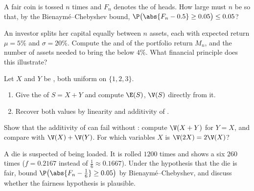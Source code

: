 \begin{exercise}[$\star$]\label{exo:g12:sums:3}
A fair coin is tossed $n$ times and $F_n$ denotes the  of heads.
How large must $n$ be so that, by the Bienaymé--Chebyshev bound,
$\P\bigl(\abs{F_n - 0.5} \geq 0.05\bigr) \leq 0.05$?
\end{exercise}

\begin{exercise}[$\star\star$]\label{exo:g12:sums:4}
An investor splits her capital equally between $n$  assets,
each with expected return $\mu = 5\%$ and 
$\sigma = 20\%$. Compute the  and  of the
portfolio return $M_n$, and the number of assets needed to bring the
 below $4\%$. What financial principle does this
illustrate?
\end{exercise}

\begin{exercise}[$\star\star$]\label{exo:g12:sums:5}
Let $X$ and $Y$ be , both uniform on $\{1, 2, 3\}$.
\begin{enumerate}
  \item Give the  of $S = X + Y$ and compute $\E(S)$, $\V(S)$
        directly from it.
  \item Recover both values by linearity and additivity of .
\end{enumerate}
\end{exercise}

\begin{exercise}[$\star\star$]\label{exo:g12:sums:6}
Show that the additivity of  can fail without :
compute $\V(X + Y)$ for $Y = X$, and compare with $\V(X) + \V(Y)$. For
which variables $X$ is $\V(2X) = 2\V(X)$?
\end{exercise}

\begin{exercise}[$\star\star$]\label{exo:g12:sums:7}
A die is suspected of being loaded. It is rolled $1200$ times and shows a
six $260$ times ($f = 0.2167$ instead of $\frac16 \approx 0.1667$). Under
the hypothesis that the die is fair, bound
$\P\bigl(\abs{F_n - \frac16} \geq 0.05\bigr)$ by Bienaymé--Chebyshev, and
discuss whether the fairness hypothesis is plausible.
\end{exercise}

